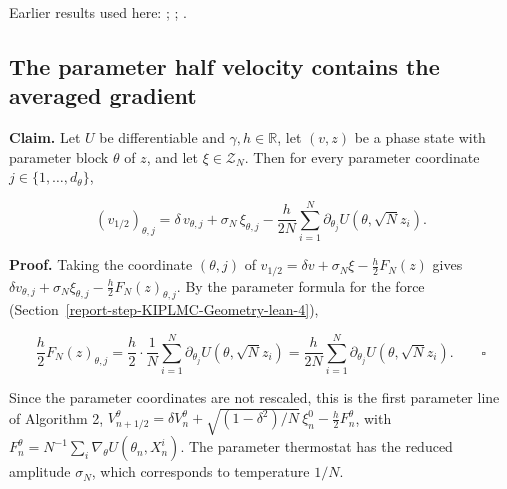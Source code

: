 \documentclass[11pt,a4paper]{report}
\begin{document}
Earlier results used here: \cite[Section~3.1.1]{LangevinLean2026IPLA}; \cite[Section~3.20.1]{LangevinLean2026Kinetic}; \cite[Section~3.20.5]{LangevinLean2026Kinetic}.
\subsection{\texorpdfstring{The parameter half velocity contains the averaged gradient}{The parameter half velocity contains the averaged gradient}}
\label{report-step-KIPLMC-Splitting-lean-2}


\textbf{Claim.} Let \(U\) be differentiable and \(\gamma,h\in\mathbb R\), let \((v,z)\) be a phase state with parameter block \(\theta\) of \(z\), and let \(\xi\in\mathcal Z_N\). Then for every parameter coordinate \(j\in\{1,\dots,d_\theta\}\),


\[(v_{1/2})_{\theta,j}=\delta\,v_{\theta,j}+\sigma_N\,\xi_{\theta,j}-\frac h{2N}\sum_{i=1}^N\partial_{\theta_j}U(\theta,\sqrt Nz_i).\]


\textbf{Proof.} Taking the coordinate \((\theta,j)\) of \(v_{1/2}=\delta v+\sigma_N\xi-\frac h2F_N(z)\) gives \(\delta v_{\theta,j}+\sigma_N\xi_{\theta,j}-\frac h2F_N(z)_{\theta,j}\). By the parameter formula for the force (Section~\ref{report-step-KIPLMC-Geometry-lean-4}),


\[\frac h2F_N(z)_{\theta,j}=\frac h2\cdot\frac1N\sum_{i=1}^N\partial_{\theta_j}U(\theta,\sqrt Nz_i)=\frac h{2N}\sum_{i=1}^N\partial_{\theta_j}U(\theta,\sqrt Nz_i).\qquad\square\]


Since the parameter coordinates are not rescaled, this is the first parameter line of Algorithm 2, \(V^\theta_{n+1/2}=\delta V^\theta_n+\sqrt{(1-\delta^2)/N}\,\xi^0_n-\frac h2F^\theta_n\), with \(F^\theta_n=N^{-1}\sum_i\nabla_\theta U(\theta_n,X^i_n)\). The parameter thermostat has the reduced amplitude \(\sigma_N\), which corresponds to temperature \(1/N\).
\end{document}
